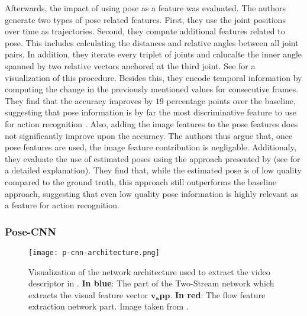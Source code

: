 Afterwards, the impact of using pose as a feature was evaluated.
The authors generate two types of pose related features. 
First, they use the joint positions over time as trajectories. 
Second, they compute additional features related to pose.
This includes calculating the distances and relative angles between all joint pairs. 
In addition, they iterate every triplet of joints and calucalte the inner angle spanned by two relative vectors anchored at the third joint.
See  for a visualization of this procedure.
Besides this, they encode temporal information by computing the change in the previously mentioned values for consecutive frames.
They find that the accuracy improves by $19$ percentage points over the baseline, suggesting that pose information is by far the most discriminative feature to use for action recognition \cite{jhuang_towards_2013}. 
Also, adding the image features to the pose features does not significantly improve upon the accuracy. 
The authors thus argue that, once pose features are used, the image feature contribution is negligable.
Additionaly, they evaluate the use of estimated poses using the approach presented by \cite{yang_articulated_2011} (see  for a detailed explanation). 
They find that, while the estimated pose is of low quality compared to the ground truth, this approach still outperforms the baseline approach, suggesting that even low quality pose information is highly relevant as a feature for action recognition.

\subsubsection{Pose-CNN}

\begin{figure}[htb!]
    \centering
    \texttt{[image: p-cnn-architecture.png]}
    \caption{Visualization of the network architecture used to extract the video descriptor in \cite{cheron_pcnn_2015}. \textbf{In blue}: The part of the Two-Stream network which extracts the visual feature vector $\bm{v_app}$. \textbf{In red}: The flow feature extraction network part. Image taken from \cite{cheron_pcnn_2015}. }
    \label{fig:p-cnn-architecture}
\end{figure}

